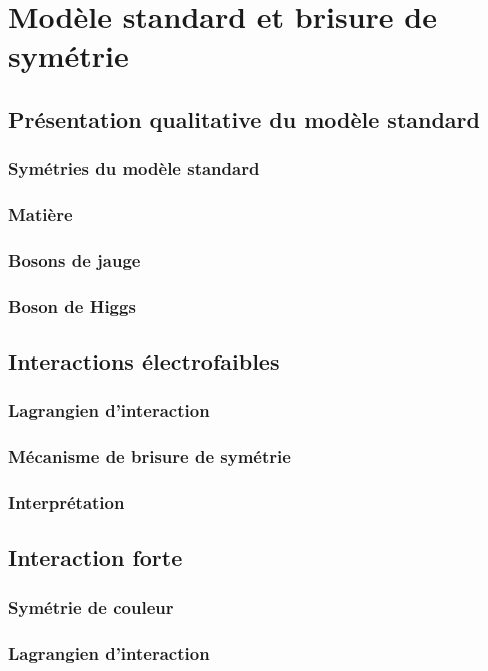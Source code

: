 \documentclass{article}
\begin{document}
		
		
		\section{Modèle standard et brisure de symétrie}
		
			\subsection{Présentation qualitative du modèle standard}
				\subsubsection{Symétries du modèle standard}
				\subsubsection{Matière}
				\subsubsection{Bosons de jauge}
				\subsubsection{Boson de Higgs}
			\subsection{Interactions électrofaibles}
				\subsubsection{Lagrangien d'interaction}
				\subsubsection{Mécanisme de brisure de symétrie}
				\subsubsection{Interprétation}
			\subsection{Interaction forte}
				\subsubsection{Symétrie de couleur}
				\subsubsection{Lagrangien d'interaction}
\end{document}
